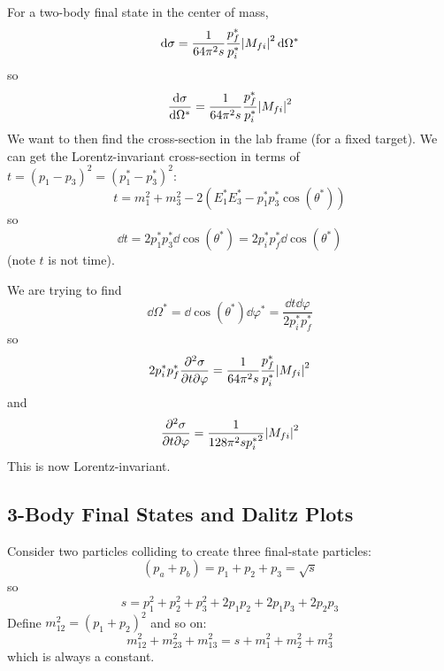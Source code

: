 \documentclass[a4paper,twoside,master.tex]{subfiles}
\begin{document}
For a two-body final state in the center of mass,
\begin{equation}
    \dd{\sigma} = \frac{1}{64 \pi^2 s} \frac{p_f^*}{p_i^*} \abs{M_{f i}}^2 \dd{\Omega^*}
\end{equation}
so
\begin{equation}
    \dv{\sigma}{\Omega^*} = \frac{1}{64 \pi^2 s} \frac{p_f^*}{p_i^*} \abs{M_{f i}}^2
\end{equation}
We want to then find the cross-section in the lab frame (for a fixed target). We can get the Lorentz-invariant cross-section in terms of $ t = (p_1 - p_3)^2 = (p_1^* - p_3^*)^2 $:
\begin{equation}
    t = m_1^2 + m_3^2 - 2(E_1^* E_3^* - p_1^* p_3^* \cos(\theta^*))
\end{equation}
so
\begin{equation}
    \dd{t} = 2 p_1^* p_3^* \dd{\cos(\theta^*)} = 2 p_i^* p_f^* \dd{\cos(\theta^*)}
\end{equation}
(note $ t $ is not time).

We are trying to find
\begin{equation}
    \dd{\Omega^*} = \dd{\cos(\theta^*)} \dd{\varphi^*} = \frac{\dd{t} \dd{\varphi}}{2 p_i^* p_f^*}
\end{equation}
so
\begin{equation}
    2 p_i^* p_f^* \pdv{\sigma}{t}{\varphi} = \frac{1}{64 \pi^2 s} \frac{p_f^*}{p_i^*} \abs{M_{f i}}^2
\end{equation}
and
\begin{equation}
    \pdv{\sigma}{t}{\varphi} = \frac{1}{128 \pi^2 s {p_i^*}^2} \abs{M_{f i}}^2
\end{equation}
This is now Lorentz-invariant.

\subsection{3-Body Final States and Dalitz Plots}\label{sub:3-body_final_states_and_dalitz_plots}

Consider two particles colliding to create three final-state particles:
\begin{equation}
    (p_a + p_b)= p_1 + p_2 + p_3 = \sqrt{s}
\end{equation}
so
\begin{equation}
    s = p_1^2 + p_2^2 + p_3^2 + 2 p_1 p_2 + 2 p_1 p_3 + 2 p_2 p_3
\end{equation}
Define $ m_{1 2}^2 = (p_1 + p_2)^2 $ and so on:
\begin{equation}
    m_{12}^2 + m_{23}^2 + m_{13}^2 = s + m_1^2 + m_2^2 + m_3^2
\end{equation}
which is always a constant.
\end{document}
